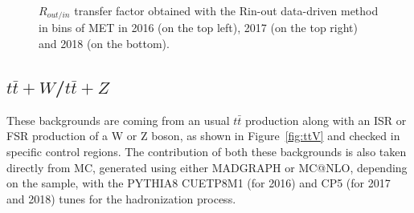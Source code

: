 \documentclass[a4paper, 10pt, openright]{report}
\begin{document}
\begin{figure}[htbp]
\begin{center}
\begin{minipage}[b]{.99\textwidth}
\begin{center}
\end{center}
\end{minipage} \hfill
\caption{$R_{out/in}$ transfer factor obtained with the Rin-out data-driven method in bins of \ac{MET} in 2016 (on the top left), 2017 (on the top right) and 2018 (on the bottom).}
\label{fig:Rinoutcheck}
\end{center}
\end{figure}

\subsection{$t \bar t + W$/$t \bar t + Z$} \label{subsection:ttV}

These backgrounds are coming from an usual $t \bar t$ production along with an \acf{ISR} or \ac{FSR} production of a W or Z boson, as shown in Figure~\ref{fig:ttV} and checked in specific control regions. The contribution of both these backgrounds is also taken directly from \ac{MC}, generated using either MADGRAPH or MC@NLO, depending on the sample, with the PYTHIA8 CUETP8M1 (for 2016) and CP5 (for 2017 and 2018) tunes for the hadronization process.
\end{document}
